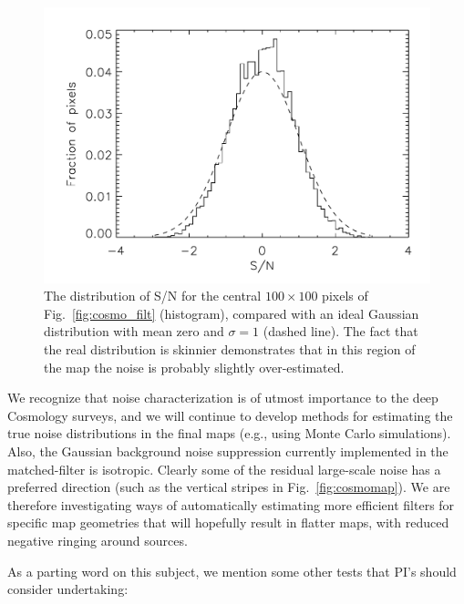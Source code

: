 \documentclass[twoside,11pt]{article}
\renewcommand{\_}{\texttt{\symbol{95}}}
\begin{document}
\begin{figure}
\begin{center}
\includegraphics[width=0.8\linewidth]{sc19_cosmo_snrcompare}
\caption{The distribution of S/N for the central $100 \times 100$
  pixels of Fig.~\ref{fig:cosmo_filt} (histogram), compared with an
  ideal Gaussian distribution with mean zero and $\sigma=1$ (dashed
  line). The fact that the real distribution is skinnier demonstrates
  that in this region of the map the noise is probably slightly
  over-estimated.}
\label{fig:cosmo_snrcompare}
\end{center}
\end{figure}

We recognize that noise characterization is of utmost importance to
the deep Cosmology surveys, and we will continue to develop methods
for estimating the true noise distributions in the final maps (e.g.,
using Monte Carlo simulations). Also, the Gaussian background noise
suppression currently implemented in the matched-filter is
isotropic. Clearly some of the residual large-scale noise has a
preferred direction (such as the vertical stripes in
Fig.~\ref{fig:cosmomap}). We are therefore investigating ways of
automatically estimating more efficient filters for specific map
geometries that will hopefully result in flatter maps, with reduced
negative ringing around sources.

As a parting word on this subject, we mention some other tests that
PI's should consider undertaking:
\end{document}
